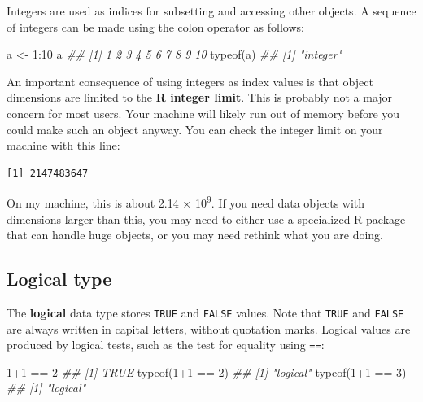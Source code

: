 \documentclass[
  13,
  letterpaper,
]{report}
\newenvironment{Shaded}{\begin{snugshade}}{\end{snugshade}}
\newcommand{\DecValTok}[1]{\textcolor[rgb]{0.68,0.00,0.00}{#1}}
\newcommand{\DocumentationTok}[1]{\textcolor[rgb]{0.37,0.37,0.37}{\textit{#1}}}
\newcommand{\FunctionTok}[1]{\textcolor[rgb]{0.28,0.35,0.67}{#1}}
\newcommand{\NormalTok}[1]{\textcolor[rgb]{0.00,0.23,0.31}{#1}}
\newcommand{\OtherTok}[1]{\textcolor[rgb]{0.00,0.23,0.31}{#1}}
\newcommand{\SpecialCharTok}[1]{\textcolor[rgb]{0.37,0.37,0.37}{#1}}
\begin{document}
Integers are used as indices for subsetting and accessing other objects.
A sequence of integers can be made using the colon operator as follows:

\begin{Shaded}
\begin{Highlighting}[]
\NormalTok{a }\OtherTok{\textless{}{-}} \DecValTok{1}\SpecialCharTok{:}\DecValTok{10}
\NormalTok{a}
\DocumentationTok{\#\#  [1]  1  2  3  4  5  6  7  8  9 10}
\FunctionTok{typeof}\NormalTok{(a)}
\DocumentationTok{\#\# [1] "integer"}
\end{Highlighting}
\end{Shaded}

An important consequence of using integers as index values is that
object dimensions are limited to the \textbf{R integer limit}. This is
probably not a major concern for most users. Your machine will likely
run out of memory before you could make such an object anyway. You can
check the integer limit on your machine with this line:

\begin{Shaded}
\end{Shaded}

\begin{verbatim}
[1] 2147483647
\end{verbatim}

On my machine, this is about 2.14 × 10\textsuperscript{9}. If you need
data objects with dimensions larger than this, you may need to either
use a specialized R package that can handle huge objects, or you may
need rethink what you are doing.

\subsection{Logical type}\label{logical-type}

The \textbf{logical} data type stores \texttt{TRUE} and \texttt{FALSE}
values. Note that \texttt{TRUE} and \texttt{FALSE} are always written in
capital letters, without quotation marks. Logical values are produced by
logical tests, such as the test for equality using \texttt{==}:

\begin{Shaded}
\begin{Highlighting}[]
\DecValTok{1}\SpecialCharTok{+}\DecValTok{1} \SpecialCharTok{==} \DecValTok{2}            
\DocumentationTok{\#\# [1] TRUE}
\FunctionTok{typeof}\NormalTok{(}\DecValTok{1}\SpecialCharTok{+}\DecValTok{1} \SpecialCharTok{==} \DecValTok{2}\NormalTok{)    }
\DocumentationTok{\#\# [1] "logical"}
\FunctionTok{typeof}\NormalTok{(}\DecValTok{1}\SpecialCharTok{+}\DecValTok{1} \SpecialCharTok{==} \DecValTok{3}\NormalTok{)    }
\DocumentationTok{\#\# [1] "logical"}
\end{Highlighting}
\end{Shaded}
\end{document}
